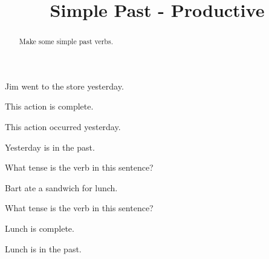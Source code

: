 \documentclass{ximera}
\title{Simple Past - Productive}
\begin{document}
\begin{abstract}
Make some simple past verbs.
\end{abstract}
\maketitle

\begin{question}
Jim went to the store yesterday.

\begin{solution}
\begin{hint}
This action is complete.
\end{hint}
\begin{hint}
This action occurred yesterday.
\end{hint}
\begin{hint}
Yesterday is in the past.
\end{hint}
What tense is the verb in this sentence?
\end{solution}
\end{question}

\begin{question}
Bart ate a sandwich for lunch.
\begin{solution}
What tense is the verb in this sentence?
\begin{multiple-choice}
\end{multiple-choice}
\begin{hint}
Lunch is complete.
\end{hint}
\begin{hint}
Lunch is in the past.
\end{hint}
\end{solution}
\end{question}
\end{document}
